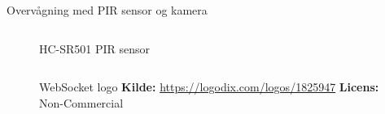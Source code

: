 \documentclass[aspectratio=169]{beamer}
\begin{document}
\begin{frame}{Overvågning med PIR sensor og kamera}
\begin{columns}
\begin{column}{0.4\textwidth}
\begin{columns}
\begin{column}{0.45\textwidth}
\begin{figure}[height=0.2\textheight]
  					\caption{HC-SR501 PIR sensor}
  					\label{fig:12vdc-lock}
				\end{figure}
			\end{column}
		\end{columns}
		\begin{columns}
			\begin{column}{0.45\textwidth}
				\begin{figure}[height=0.2\textheight]
  					
  					\caption{WebSocket logo
  					\captionline \textbf{Kilde:} \url{https://logodix.com/logos/1825947}
  					\captionline \textbf{Licens:} Non-Commercial}
  					\label{fig:websocket-logo}
				\end{figure}
			\end{column}
		\end{columns}
	\end{column}
\end{columns}
\end{frame}
\end{document}
